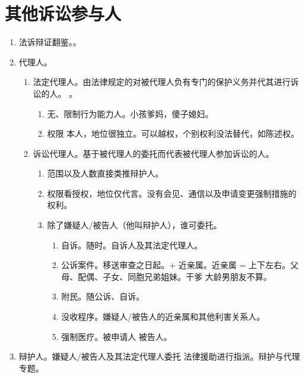 \section{其他诉讼参与人}
\begin{enumerate}
  \item 法诉辩证翻鉴。。
  \item 代理人。
        \begin{enumerate}
          \item 法定代理人。由法律规定的对被代理人负有专门的保护义务并代其进行诉讼的人。
                。
                \begin{enumerate}
                  \item 无、限制行为能力人。小孩爹妈，傻子媳妇。
                  \item 权限 \ydy 本人，地位很独立。可以越权，个别权利没法替代，如陈述权。
                \end{enumerate}
          \item 诉讼代理人。基于被代理人的委托而代表被代理人参加诉讼的人。
                \begin{enumerate}
                  \item 范围以及人数直接类推辩护人。
                  \item 权限看授权，地位仅代言。没有会见、通信以及申请变更强制措施的权利。
                  \item 除了嫌疑人/被告人（他叫辩护人），谁可委托。
                        \begin{enumerate}
                          \item 自诉。随时。自诉人及其法定代理人。
                          \item 公诉案件。移送审查之日起。+ 近亲属。近亲属 = 上下左右。父母、配偶、子女、同胞兄弟姐妹。干爹 \ydy 大龄男朋友不算。
                          \item 附民。随公诉、自诉。
                          \item 没收程序。嫌疑人/被告人的近亲属和其他利害关系人。
                          \item 强制医疗。被申请人 \hz 被告人。
                        \end{enumerate}
                \end{enumerate}
        \end{enumerate}
  \item 辩护人。嫌疑人/被告人及其法定代理人委托 \hz 法律援助进行指派。辩护与代理专题。

\end{enumerate}
